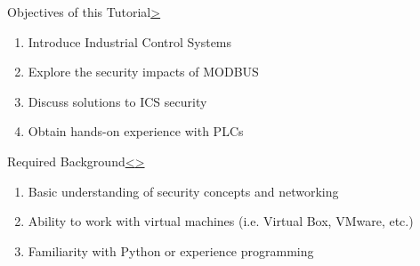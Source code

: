 \documentclass[12pt]{extarticle}
\newenvironment{instructionblock}{\Large\bgroup}{\egroup}
\newcommand{\ben}{\begin{enumerate}}
\newcommand{\een}{\end{enumerate}}
\newcounter{next}
\newcounter{prev}
\begin{document}

	\pagebreak
	\setcounter{section}{1}
	\begin{slide}{Objectives of this Tutorial}{\hyperref[slide \thenext]{\textgreater}}
		\begin{instructionblock}
				\ben 
					\item Introduce Industrial Control Systems
					\item Explore the security impacts of MODBUS
					\item Discuss solutions to ICS security
					\item Obtain hands-on experience with PLCs
				\een
		\end{instructionblock}
	\end{slide}
	
	
	
	
	\pagebreak
	\begin{slide}{Required Background}{\hyperref[slide \theprev]{\textless}\hyperref[slide \thenext]{\textgreater}}
		\begin{instructionblock}
			\ben
				\item Basic understanding of security concepts and networking
				\item Ability to work with virtual machines (i.e. Virtual Box, VMware, etc.)
				\item Familiarity with Python or experience programming
			\een
		\end{instructionblock}
	\end{slide}
	
	\pagebreak
	
	
\end{document}
